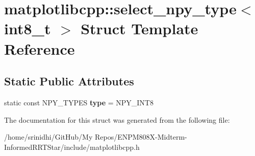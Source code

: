 \hypertarget{structmatplotlibcpp_1_1select__npy__type_3_01int8__t_01_4}{}\section{matplotlibcpp\+:\+:select\+\_\+npy\+\_\+type$<$ int8\+\_\+t $>$ Struct Template Reference}
\label{structmatplotlibcpp_1_1select__npy__type_3_01int8__t_01_4}
\subsection*{Static Public Attributes}
\begin{DoxyCompactItemize}
\item 
static const N\+P\+Y\+\_\+\+T\+Y\+P\+ES {\bfseries type} = N\+P\+Y\+\_\+\+I\+N\+T8\hypertarget{structmatplotlibcpp_1_1select__npy__type_3_01int8__t_01_4_a74836a19458ed32ca8948a4337364eae}{}\label{structmatplotlibcpp_1_1select__npy__type_3_01int8__t_01_4_a74836a19458ed32ca8948a4337364eae}

\end{DoxyCompactItemize}


The documentation for this struct was generated from the following file\+:\begin{DoxyCompactItemize}
\item 
/home/srinidhi/\+Git\+Hub/\+My Repos/\+E\+N\+P\+M808\+X-\/\+Midterm-\/\+Informed\+R\+R\+T\+Star/include/matplotlibcpp.\+h\end{DoxyCompactItemize}
